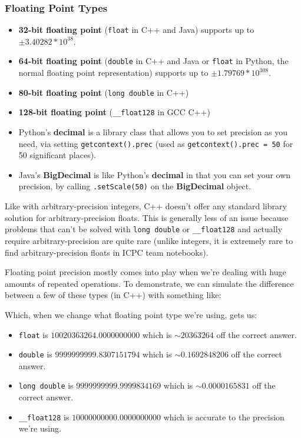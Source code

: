 \subsubsection{Floating Point Types}

\begin{itemize}
\item \textbf{32-bit floating point} (\texttt{float} in C++ and Java) supports up to $\pm3.40282 * 10^{38}$.
\item \textbf{64-bit floating point} (\texttt{double} in C++ and Java or \texttt{float} in Python, the normal floating point representation) supports up to $\pm1.79769 * 10^{308}$.
\item \textbf{80-bit floating point} (\texttt{long double} in C++)
\item \textbf{128-bit floating point} (\texttt{__float128} in GCC C++)
\item Python's \textbf{decimal} is a library class that allows you to set precision as you need, via setting \texttt{getcontext().prec} (used as \texttt{getcontext().prec = 50} for 50 significant places).
\item Java's \textbf{BigDecimal} is like Python's \textbf{decimal} in that you can set your own precision, by calling \texttt{.setScale(50)} on the \textbf{BigDecimal} object.
\end{itemize}

Like with arbitrary-precision integers, C++ doesn't offer any standard library solution for arbitrary-precision floats. This is generally less of an issue because problems that can't be solved with \texttt{long double} or \texttt{__float128} and actually require arbitrary-precision are quite rare (unlike integers, it is extremely rare to find arbitrary-precision floats in ICPC team notebooks).

Floating point precision mostly comes into play when we're dealing with huge amounts of repeated operations. To demonstrate, we can simulate the difference between a few of these types (in C++) with something like:


Which, when we change what floating point type we're using, gets us:

\begin{itemize}
\item \texttt{float} is $10020363264.0000000000$ which is $\sim20363264$ off the correct answer.
\item \texttt{double} is $9999999999.8307151794$ which is $\sim0.1692848206$ off the correct answer.
\item \texttt{long double} is $9999999999.9999834169$ which is $\sim0.0000165831$ off the correct answer.
\item \texttt{__float128} is $10000000000.0000000000$ which is accurate to the precision we're using.
\end{itemize}

